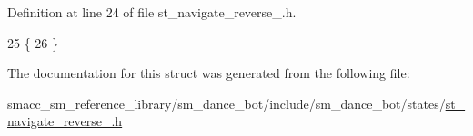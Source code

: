 Definition at line 24 of file st\+\_\+navigate\+\_\+reverse\+\_.\+h.


\begin{DoxyCode}
25    \{
26    \}
\end{DoxyCode}


The documentation for this struct was generated from the following file\+:\begin{DoxyCompactItemize}
\item 
smacc\+\_\+sm\+\_\+reference\+\_\+library/sm\+\_\+dance\+\_\+bot/include/sm\+\_\+dance\+\_\+bot/states/\hyperlink{st__navigate__reverse__3_8h}{st\+\_\+navigate\+\_\+reverse\+\_.\+h}\end{DoxyCompactItemize}
